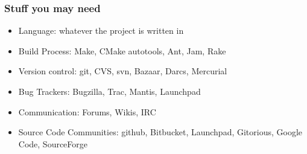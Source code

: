 \documentclass{beamer}
\begin{document}
\begin{frame}
  \frametitle{Stuff you may need}
    \begin{itemize}[<+->]
    \item Language: whatever the project is written in
    \item Build Process: Make, CMake autotools, Ant, Jam, Rake
    \item Version control: git, CVS, svn, Bazaar, Darcs, Mercurial
    \item Bug Trackers: Bugzilla, Trac, Mantis, Launchpad
    \item Communication: Forums, Wikis, IRC
    \item Source Code Communities: github, Bitbucket, Launchpad,
      Gitorious, Google Code, SourceForge
    \end{itemize}
\end{frame}

\end{document}
